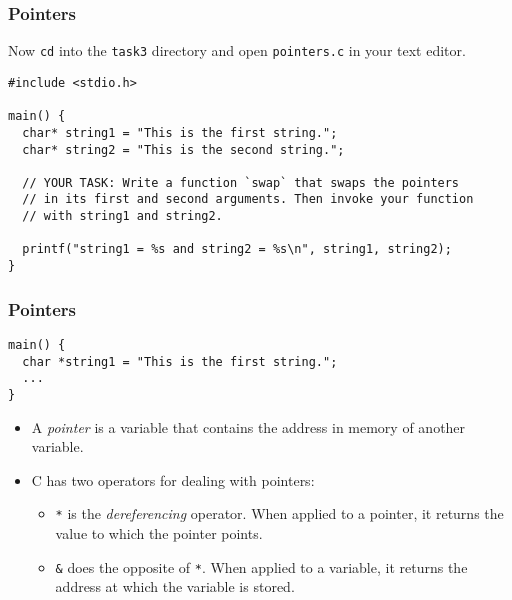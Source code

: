 \documentclass[pdf]{beamer}
\begin{document}
\begin{frame}[fragile]
  \frametitle{Pointers}

  Now \texttt{cd} into the \texttt{task3} directory and
  open \texttt{pointers.c} in your text editor.

  \pause

  \bigskip

\begin{verbatim}
#include <stdio.h>

main() {
  char* string1 = "This is the first string.";
  char* string2 = "This is the second string.";

  // YOUR TASK: Write a function `swap` that swaps the pointers
  // in its first and second arguments. Then invoke your function
  // with string1 and string2.

  printf("string1 = %s and string2 = %s\n", string1, string2);
}
\end{verbatim}

\end{frame}

\begin{frame}[fragile]
  \frametitle{Pointers}

\begin{verbatim}
main() {
  char *string1 = "This is the first string.";
  ...
}
\end{verbatim}

  \bigskip

  \begin{itemize}
  \item A \textit{pointer} is a variable that contains the address in memory of
    another variable. \pause
  \item C has two operators for dealing with pointers: \pause
    \begin{itemize}
    \item \texttt{*} is the \textit{dereferencing} operator. When applied
      to a pointer, it returns the value to which the pointer points. \pause
    \item \texttt{&} does the opposite of \texttt{*}. When applied
      to a variable, it returns the address at which the variable is stored.
    \end{itemize}
  \end{itemize}
\end{frame}
\end{document}
